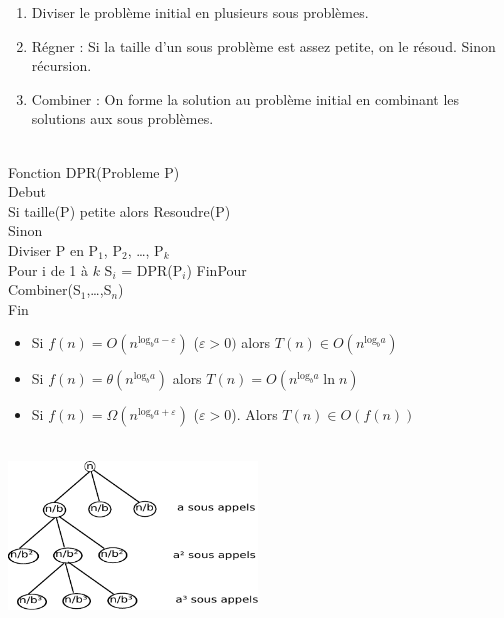 \begin{enumerate}
	\item Diviser le problème initial en plusieurs sous problèmes.
	\item Régner : Si la taille d'un sous problème est assez petite, on le résoud. Sinon récursion.
	\item Combiner : On forme la solution au problème initial en combinant les solutions aux sous problèmes.
\end{enumerate}

\\
Fonction DPR(Probleme P)\\
Debut\\
	\hspace*{1cm} Si taille(P) petite alors Resoudre(P)\\
	\hspace*{1cm} Sinon \\
		\hspace*{2cm} Diviser P en P$_1$, P$_2$, \ldots, P$_k$ \\
		\hspace*{2cm} Pour i de 1 à $k$ S$_i$ = DPR(P$_i$) FinPour \\
		\hspace*{2cm} Combiner(S$_1$,\ldots,S$_n$)\\
Fin\\

\begin{itemize}
	\item Si $f(n) = O(n^{\mathrm{log}_ba-\varepsilon})$ ($\varepsilon > 0)$ alors $T(n)\in O(n^{\mathrm{log}_ba})$
	\item Si $f(n) = \theta(n^{\mathrm{log}_ba})$ alors $T(n) = O(n^{\mathrm{log}_ba}\ln n)$
	\item Si $f(n) = \Omega(n^{\mathrm{log}_ba+\varepsilon})$ ($\varepsilon > 0$). Alors $T(n) \in O(f(n))$
\end{itemize}

\newpage

\\

\includegraphics[width=250px]{Images/03_arbreDR.pdf}\\

